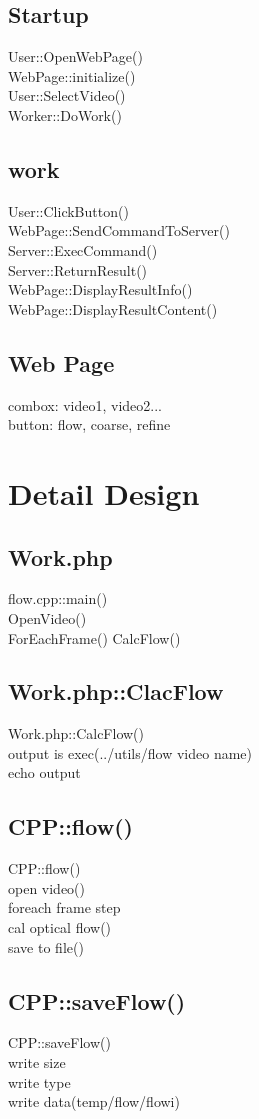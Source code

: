 \documentclass{article}
\begin{document}
\subsection{Startup}

User::OpenWebPage()\\
\indent WebPage::initialize()\\
\indent User::SelectVideo()\\
\indent Worker::DoWork()

\subsection{work}
User::ClickButton()\\
\indent WebPage::SendCommandToServer()\\
\indent Server::ExecCommand()\\
\indent Server::ReturnResult()\\
\indent \indent WebPage::DisplayResultInfo()\\
\indent \indent WebPage::DisplayResultContent()

\subsection{Web Page}

combox: video1, video2...\\
button: flow, coarse, refine

\section{Detail Design}

\subsection{Work.php}
flow.cpp::main()\\
\indent OpenVideo()\\
\indent ForEachFrame()
\indent CalcFlow()

\subsection{Work.php::ClacFlow}
Work.php::CalcFlow()\\
\indent output is exec(../utils/flow video name)\\
\indent echo output



\subsection{CPP::flow()}
CPP::flow()\\
\indent open video()\\
\indent foreach frame step\\
\indent \indent cal optical flow()\\
\indent \indent save to file()

\subsection{CPP::saveFlow()}
CPP::saveFlow()\\
\indent write size\\
\indent write type\\
\indent write data(temp/flow/flowi)


\iffalse
\fi
\end{document}
